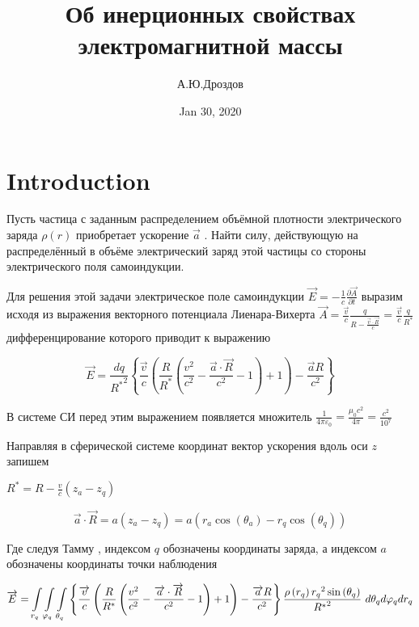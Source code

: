 \documentclass{article}
\begin{document}
\title{Об инерционных свойствах электромагнитной массы}

\author{А.Ю.Дроздов}

\date{Jan 30, 2020}



\section{Introduction}



Пусть частица с заданным распределением объёмной плотности электрического заряда $\rho \left( r \right)$ приобретает ускорение $\overrightarrow{a}$ . Найти силу, действующую на распределённый в объёме электрический заряд этой частицы со стороны электрического поля самоиндукции.

Для решения этой задачи электрическое поле самоиндукции $\overrightarrow{E}=-\frac{1}{c}\frac{\partial \overrightarrow{A}}{\partial t}$
выразим исходя из выражения векторного потенциала Лиенара-Вихерта \cite{LL2} $\overrightarrow{A}=\frac{\overrightarrow{v}}{c}\frac{q}{R-\frac{\overrightarrow{v}\cdot \overrightarrow{R}}{c}}=\frac{\overrightarrow{v}}{c}\frac{q}{{{R}^{*}}}$ дифференцирование которого приводит к выражению \cite{rustot}

\[\overrightarrow{E}=\frac{dq}{{{R}^{*}}^{2}}\left\{ \frac{\overrightarrow{v}}{c}\left( \frac{R}{{{R}^{*}}}\left( \frac{{{v}^{2}}}{{{c}^{2}}}-\frac{\overrightarrow{a}\cdot \overrightarrow{R}}{{{c}^{2}}}-1 \right)+1 \right)-\frac{\overrightarrow{a}R}{{{c}^{2}}} \right\}\]

В системе СИ перед этим выражением появляется множитель $\frac{1}{4\pi {{\varepsilon }_{0}}}=\frac{{{\mu }_{0}}{{c}^{2}}}{4\pi }=\frac{{{c}^{2}}}{{{10}^{7}}}$

Направляя в сферической системе координат вектор ускорения вдоль оси $z$  запишем

${{R}^{*}}=R-\frac{v}{c}\left( {{z}_{a}}-{{z}_{q}} \right)$

\[\overrightarrow{a}\cdot \overrightarrow{R}=a\left( {{z}_{a}}-{{z}_{q}} \right)=a\left( {{r}_{a}}\cos \left( {{\theta }_{a}} \right)-{{r}_{q}}\cos \left( {{\theta }_{q}} \right) \right)\]

Где следуя Тамму \cite{tamm}, индексом $q$ обозначены координаты заряда, а индексом $a$ обозначены координаты точки наблюдения

\[\overrightarrow{E}=\int\limits_{{{r}_{q}}}\int\limits_{{{\varphi}_{q}}}\int\limits_{{{\theta}_{q}}}\\
{\left\{ \frac{\overrightarrow{v}}{c}\left( \frac{R}{{{R}^{*}}}\left( \frac{{{v}^{2}}}{{{c}^{2}}}-\frac{\overrightarrow{a}\cdot \overrightarrow{R}}{{{c}^{2}}}-1 \right)+1 \right)-\frac{\overrightarrow{a}R}{{{c}^{2}}} \right\}\frac{\rho \left( {{r}_{q}} \right){{r}_{q}}^{2}\sin \left( {{\theta }_{q}} \right)}{{{R}^{*}}^{2}}\ }d{{\theta }_{q}}d{{\varphi }_{q}}d{{r}_{q}}\]
\end{document}
